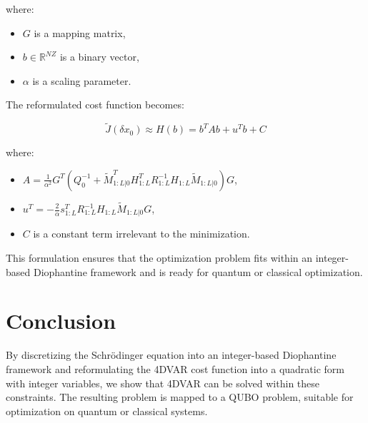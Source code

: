 \documentclass{article}
\begin{document}
where:
\begin{itemize}
    \item \( G \) is a mapping matrix,
    \item \( b \in \mathbb{R}^{NZ} \) is a binary vector,
    \item \( \alpha \) is a scaling parameter.
\end{itemize}

The reformulated cost function becomes:

\[
\tilde{J}(\delta x_0) \approx H(b) = b^T A b + u^T b + C
\]

where:
\begin{itemize}
    \item \( A = \frac{1}{\alpha^2} G^T \left( Q_0^{-1} + \tilde{M}^T_{1:L|0} H^T_{1:L} R_{1:L}^{-1} H_{1:L} \tilde{M}_{1:L|0} \right) G \),
    \item \( u^T = -\frac{2}{\alpha} s^T_{1:L} R_{1:L}^{-1} H_{1:L} \tilde{M}_{1:L|0} G \),
    \item \( C \) is a constant term irrelevant to the minimization.
\end{itemize}

This formulation ensures that the optimization problem fits within an integer-based Diophantine framework and is ready for quantum or classical optimization.

\section{Conclusion}

By discretizing the Schrödinger equation into an integer-based Diophantine framework and reformulating the 4DVAR cost function into a quadratic form with integer variables, we show that 4DVAR can be solved within these constraints. The resulting problem is mapped to a QUBO problem, suitable for optimization on quantum or classical systems.
\end{document}
